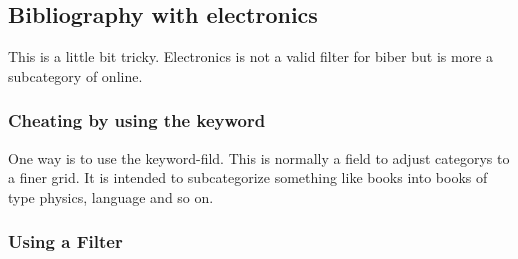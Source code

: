 \documentclass{article}
\begin{document}
\subsection{Bibliography with electronics}
This is a little bit tricky. Electronics is not a valid filter for biber but is more a subcategory of online. 

\subsubsection{Cheating by using the keyword}
One way is to use the keyword-fild. This is normally a field to adjust categorys to a finer grid. It is intended to subcategorize something like books into books of type physics, language and so on. 
\printbibliography[keyword=elec, title={Only electronics}]

\subsubsection{Using a Filter}
\printbibliography[filter=electronics]
\end{document}
